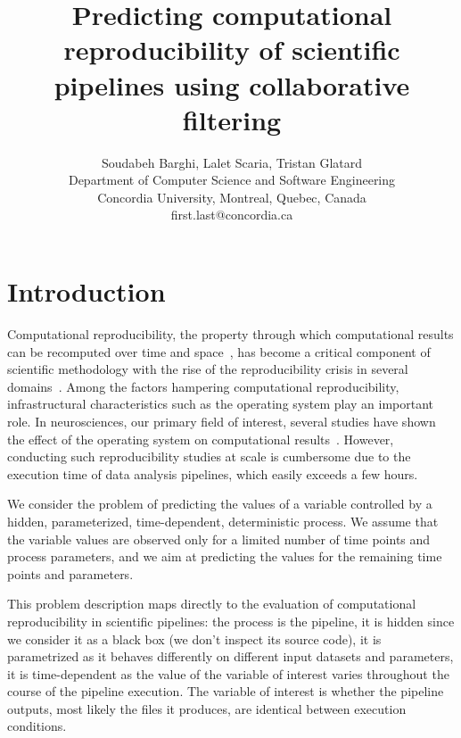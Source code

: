\documentclass[10pt, conference, compsocconf]{IEEEtran}
\begin{document}
\title{Predicting computational reproducibility of scientific pipelines using collaborative filtering}

\author{Soudabeh Barghi, Lalet Scaria, Tristan Glatard\\
  Department of Computer Science and Software Engineering\\ Concordia University, Montreal, Quebec, Canada\\
  {first.last}@concordia.ca}

\maketitle

\begin{abstract}
\end{abstract}


\section{Introduction}

Computational reproducibility, the property through which
computational results can be recomputed over time and
space~\cite{peng2011reproducible}, has become a critical component of scientific
methodology with the rise of the reproducibility crisis in several 
domains~\cite{baker2016there}. Among the factors hampering 
computational reproducibility, infrastructural characteristics such as 
the operating system play an important role. In neurosciences, our 
primary field of interest, several studies have shown the effect of the 
operating system on computational 
results~\cite{gronenschild2012effects, glatard2015reproducibility}. 
However, conducting such reproducibility studies at scale is cumbersome 
due to the execution time of data analysis pipelines, which easily 
exceeds a few hours.

We consider the problem of predicting the values of a variable 
controlled by a hidden, parameterized, time-dependent, deterministic 
process. We assume that the variable values are observed only for a 
limited number of time points and process parameters, and we aim at 
predicting the values for the remaining time points and parameters.

This problem description maps directly to the evaluation of 
computational reproducibility in scientific pipelines: the process is 
the pipeline, it is hidden since we consider it as a black box (we 
don't inspect its source code), it is parametrized as it behaves 
differently on different input datasets and parameters, it is 
time-dependent as the value of the variable of interest varies 
throughout the course of the pipeline execution. The variable of 
interest is whether the pipeline outputs, most likely the files it 
produces, are identical between execution conditions.
\end{document}
